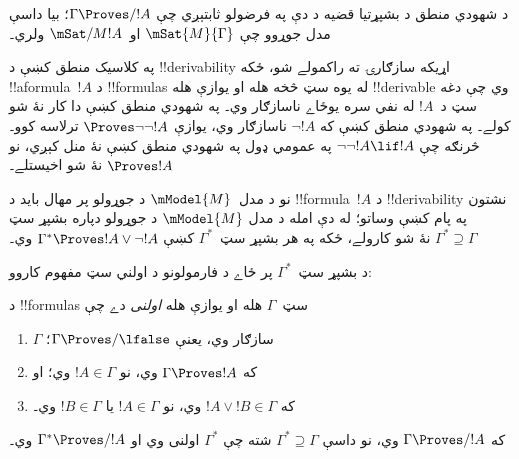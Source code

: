 \documentclass[../../../include/open-logic-section]{subfiles}
\begin{document}


د شهودي منطق د بشپړتيا قضيه د دې په فرضولو ثابتېږي چې
$\Gamma \Proves/ !A$؛ بيا داسې مدل جوړوو چې
$\mSat{M}{\Gamma}$ او~$\mSat/{M}{!A}$ ولري۔

په کلاسيک منطق کښې د !!{derivability} اړيکه سازګارۍ ته راکمولے
شو، ځکه !!a{formula}~$!A$ د !!{formula}s له يوه سټ څخه هله او
يوازې هله !!{derivable} وي چې دغه سټ د~$!A$ له نفي سره يوځاے
ناسازګار وي۔ په شهودي منطق کښې دا کار نۀ شو کولے۔ په شهودي منطق
کښې که $\lnot!A$ ناسازګار وي، يوازې $\Proves \lnot\lnot !A$
ترلاسه کوو۔ څرنګه چې $\lnot\lnot!A \lif !A$ په عمومي ډول په
شهودي منطق کښې نۀ منل کېږي، نو $\Proves !A$ نۀ شو اخيستلے۔

نو د مدل~$\mModel{M}$ د جوړولو پر مهال بايد د
!!{formula}~$!A$ د !!{derivability} نشتون په پام کښې وساتو؛ له دې امله د مدل
$\mModel{M}$ د جوړولو دپاره بشپړ سټ $\Gamma^* \supseteq \Gamma$
نۀ شو کارولے، ځکه په هر بشپړ سټ~$\Gamma^*$ کښې
$\Gamma^* \Proves !A \lor \lnot !A$ وي۔

د بشپړ سټ~$\Gamma^*$ پر ځاے د فارمولونو د اولني سټ مفهوم کاروو:

\begin{defn}
  د !!{formula}s سټ~$\Gamma$ هله او يوازې هله \emph{اولنی} دے چې
  \begin{enumerate}
  \item{} $\Gamma$ سازګار وي، يعنې $\Gamma \Proves/ \lfalse$؛
  \item{} که $\Gamma \Proves !A$ وي، نو $!A \in \Gamma$ وي؛ او
  \item{} که $!A \lor !B \in \Gamma$ وي، نو $!A \in
    \Gamma$ يا $!B \in \Gamma$ وي۔
  \end{enumerate}
\end{defn}

\begin{lem}
   که $\Gamma \Proves/ !A$ وي، نو داسې
  $\Gamma^* \supseteq \Gamma$ شته چې $\Gamma^*$ اولنی وي او
  $\Gamma^* \Proves/ !A$ وي۔
\end{lem}
\end{document}
